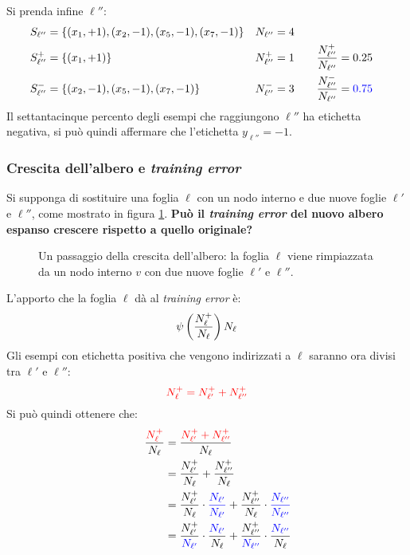 Si prenda infine $\ell''$:
$$
\begin{aligned}
    &S_{\ell''} = \{ (x_1,+1),(x_2,-1),(x_5,-1),(x_7,-1) \} & N_{\ell''}=4 \\
    &S_{\ell''}^+ = \{ (x_1,+1) \} & N_{\ell''}^+=1 & \qquad \frac{N_{\ell''}^+}{N_{\ell''}}=0.25 \\
    &S_{\ell''}^- = \{ (x_2,-1),(x_5,-1),(x_7,-1) \} & N_{\ell''}^-=3 
        & \qquad \frac{N_{\ell''}^-}{N_{\ell''}}={\color{blue}0.75} \\
\end{aligned}
$$
Il {\color{blue}settantacinque percento} degli esempi che raggiungono $\ell''$ ha etichetta
negativa, si può quindi affermare che l'etichetta $y_{\ell''}=-1$.

\subsubsection{Crescita dell'albero e \textit{training error}}

Si supponga di sostituire una foglia $\ell$ con un nodo interno e due nuove foglie $\ell'$
e $\ell''$, come mostrato in figura \ref{fig:tree_growth}. \textbf{Può il \textit{training
error} del nuovo albero espanso crescere rispetto a quello originale?}

\begin{figure}[h]
    \centering
    
    \caption{Un passaggio della crescita dell'albero: la foglia $\ell$ viene
        rimpiazzata da un nodo interno $v$ con due nuove foglie $\ell'$ e $\ell''$.
        \label{fig:tree_growth}}
\end{figure}

L'apporto che la foglia $\ell$ dà al \textit{training error} è:
\begin{equation}
    \psi \left(\frac{N_{\ell}^+}{N_{\ell}}\right)N_{\ell}\label{eq:tree_1}
\end{equation}
Gli esempi con etichetta positiva che vengono indirizzati a $\ell$ saranno ora divisi 
tra $\ell'$ e $\ell''$:
\begin{equation} {\color{red}\ensuremath{N_{\ell}^+}= \ensuremath{N_{\ell'}^+}+ \ensuremath{N_{\ell''}^+}} \label{eq:tree_3} \end{equation}
Si può quindi ottenere che:
\begin{align}
    \qquad \frac{\color{red}N_{\ell}^+}{N_{\ell}} 
        &= \frac{\color{red}N_{\ell'}^+ + N_{\ell''}^+}{N_{\ell}} \notag\\
        &= \frac{N_{\ell'}^+}{N_{\ell}}+\frac{N_{\ell''}^+}{N_{\ell}} \notag\\
        &= \frac{N_{\ell'}^+}{N_{\ell}}\cdot{\color{blue}\frac{N_{\ell'}}{N_{\ell'}}}
            +\frac{N_{\ell''}^+}{N_{\ell}}\cdot{\color{blue}\frac{N_{\ell''}}{N_{\ell''}}}\notag\\
        &= \frac{N_{\ell'}^+}{\color{blue}N_{\ell'}}\cdot
            \frac{\color{blue}N_{\ell'}}{N_{\ell}}
            +\frac{N_{\ell''}^+}{\color{blue}N_{\ell''}}\cdot
            \frac{\color{blue}N_{\ell''}}{N_{\ell}} \label{eq:tree_2}
\end{align}

